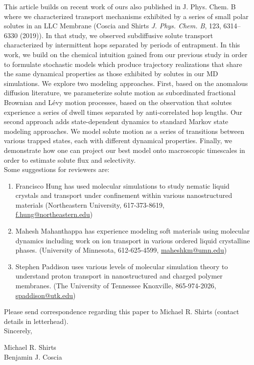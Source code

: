 \documentclass[fontsize=11pt]{article}
\begin{document}
	This article builds on recent work of ours also published in J. Phys. Chem. B 
    where we characterized transport mechanisms exhibited by a series of 
	small polar solutes in an LLC Membrane (Coscia and Shirts \textit{J. Phys.
	Chem. B}, 123, 6314--6330 (2019)). In that study, we observed subdiffusive solute transport
	characterized by intermittent hops separated by periods of entrapment. In
	this work, we build on the chemical intuition gained from our previous study
	in order to formulate stochastic models which produce trajectory realizations
	that share the same dynamical properties as those exhibited by solutes in 
	our MD simulations. We explore two modeling approaches. First, based on the
	anomalous diffusion literature, we parameterize solute motion as 
    subordinated fractional Brownian and L\'evy motion processes, based on the observation that 
	solutes experience a series of dwell times separated by anti-correlated hop
	lengths. Our second approach adds state-dependent dynamics to standard Markov
	state modeling approaches. We model solute motion as a series of transitions
	between various trapped states, each with different dynamical properties.
	Finally, we demonstrate how one can project our best model onto macroscopic 
	timescales in order to estimate solute flux and selectivity.\\
	
	\noindent Some suggestions for reviewers are:
	\begin{enumerate}
	
		\item Francisco Hung has used molecular simulations to study nematic liquid crystals
		and transport under confinement within various nanostructured materials 
		(Northeastern University, 617-373-8619,\\ \href{mailto:f.hung@northeastern.edu}{f.hung@northeastern.edu})
		
		\item Mahesh Mahanthappa has experience modeling soft materials using molecular dynamics
		including work on ion transport in various ordered liquid crystalline phases. 
		(University of Minnesota, 612-625-4599, \href{mailto:maheshkm@umn.edu}{maheshkm@umn.edu})
		
		\item Stephen Paddison uses various levels of molecular simulation theory to understand
		proton transport in nanostructured and charged polymer membranes. (The University of Tennessee 
		Knoxville, 865-974-2026, \href{mailto:spaddison@utk.edu}{spaddison@utk.edu})
		
	\end{enumerate}
	
	\noindent Please send correspondence regarding this paper to Michael R. Shirts (contact
	details in letterhead).\\	
	
	\noindent Sincerely,
	
	\noindent Michael R. Shirts \\
	\noindent Benjamin J. Coscia \\
	
\end{document}
